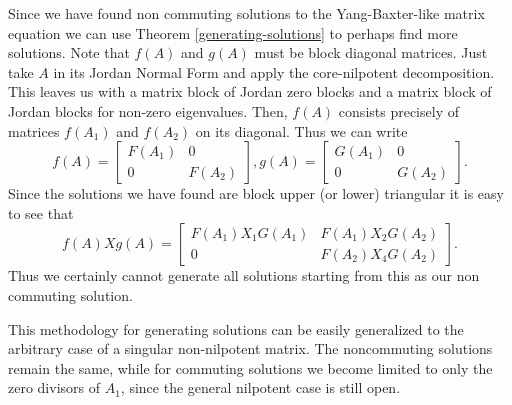 \documentclass{article}
\begin{document}
  Since we have found non commuting solutions to the Yang-Baxter-like matrix equation we can use Theorem \ref{generating-solutions} to perhaps find more solutions.
  Note that $f(A)$ and $g(A)$ must be block diagonal matrices.
  Just take $A$ in its Jordan Normal Form and apply the core-nilpotent decomposition.
  This leaves us with a matrix block of Jordan zero blocks and a matrix block of Jordan blocks for non-zero eigenvalues.
  Then, $f(A)$ consists precisely of matrices $f(A_1)$ and $f(A_2)$ on its diagonal.
  Thus we can write
  \[f(A) = \begin{bmatrix} F (A_1) & 0\\ 0 & F (A_2) \end{bmatrix}, g(A) = \begin{bmatrix} G (A_1) & 0\\ 0 & G (A_2) \end{bmatrix}.\]
    Since the solutions we have found are block upper (or lower) triangular it is easy to see that
  \[f(A) X g(A) = \begin{bmatrix} F (A_1) X_1 G (A_1) & F (A_1) X_2 G (A_2)\\ 0 & F (A_2) X_4 G (A_2) \end{bmatrix}.\]
  Thus we certainly cannot generate all solutions starting from this as our non commuting solution.

\begin{remark}
  This methodology for generating solutions can be easily generalized to the arbitrary case of a singular non-nilpotent matrix.
  The noncommuting solutions remain the same, while for commuting solutions we become limited to only the zero divisors of $A_1$, since the general nilpotent case is still open.
\end{remark}
\end{document}
